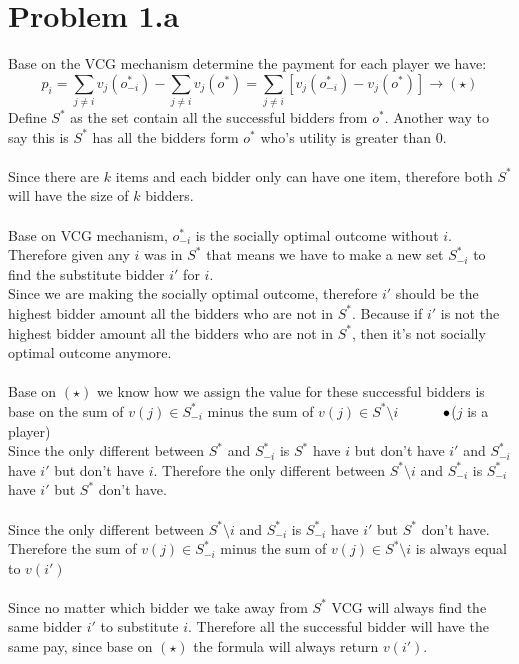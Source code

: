 \documentclass{article}
\newcommand\tab[1][1cm]{\hspace*{#1}}
\begin{document}
\section{Problem 1.a}
Base on the VCG mechanism determine the payment for each player we have:
$$p_i = \sum_{j \not = i} v_j(o_{-i}^*) - \sum_{j \not = i}v_j(o^*) = \sum_{j \not = i}[v_j(o_{-i}^*) - v_j(o^*)] \longrightarrow (\star)$$
Define $S^*$ as the set contain all the successful bidders from $o^*$. Another way to say this is $S^*$ has all the bidders form $o^*$ who's utility is greater than $0$.\\\\
Since there are $k$ items and each bidder only can have one item, therefore both $S^*$ will have the size of $k$ bidders.\\\\
Base on VCG mechanism, $o^*_{-i}$ is the socially optimal outcome without $i$. Therefore given any $i$ was in $S^*$ that means we have to make a new set $S^*_{-i}$ to find the substitute bidder $i'$ for $i$.\\
Since we are making the socially optimal outcome, therefore $i'$ should be the highest bidder amount all the bidders who are not in $S^*$. Because if $i'$ is not the highest bidder amount all the bidders who are not in $S^*$, then it's not socially optimal outcome anymore.\\\\
Base on $(\star)$ we know how we assign the value for these successful bidders is base on the sum of $v(j) \in S^*_{-i}$ minus the sum of $v(j) \in S^* \setminus i$ $\tab \bullet$($j$ is a player)\\
Since the only different between $S^*$ and $S^*_{-i}$ is $S^*$ have $i$ but don't have $i'$ and $S^*_{-i}$ have $i'$ but don't have $i$. Therefore the only different between $S^*\setminus i$ and $S^*_{-i}$ is $S^*_{-i}$ have $i'$ but $S^*$ don't have.\\\\
Since the only different between $S^*\setminus i$ and $S^*_{-i}$ is $S^*_{-i}$ have $i'$ but $S^*$ don't have. Therefore the sum of $v(j) \in S^*_{-i}$ minus the sum of $v(j) \in S^* \setminus i$ is always equal to $v(i')$\\\\
Since no matter which bidder we take away from $S^*$ VCG will always find the same bidder $i'$ to substitute $i$. Therefore all the successful bidder will have the same pay, since base on $(\star)$ the formula will always return $v(i')$.
\end{document}
